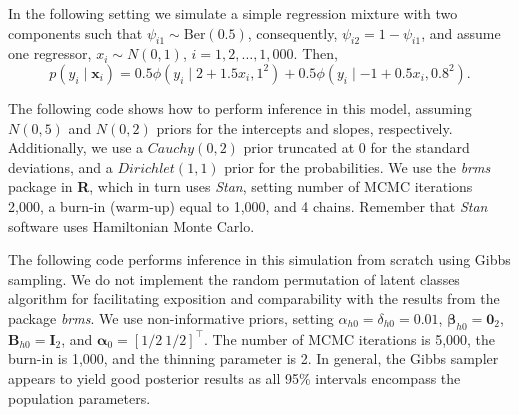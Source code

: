 In the following setting we simulate a simple regression mixture with two components such that $\psi_{i1}\sim \text{Ber}(0.5)$, consequently, $\psi_{i2}=1-\psi_{i1}$, and assume one regressor, $x_i\sim N(0,1)$, $i=1,2,\dots,1,000$. Then, 
$$p(y_i \mid \boldsymbol{x}_i) = 
0.5 \phi(y_i \mid 2+1.5x_i,1^2)+0.5 \phi(y_i \mid -1+0.5x_i,0.8^2).$$

The following code shows how to perform inference in this model, assuming $N(0,5)$ and $N(0,2)$ priors for the intercepts and slopes, respectively. Additionally, we use a $Cauchy(0,2)$ prior truncated at 0 for the standard deviations, and a $Dirichlet(1,1)$ prior for the probabilities. We use the \textit{brms} package in \textbf{R}, which in turn uses \textit{Stan}, setting number of MCMC iterations 2,000, a burn-in (warm-up) equal to 1,000, and 4 chains. Remember that \textit{Stan} software uses Hamiltonian Monte Carlo.

The following code performs inference in this simulation from scratch using Gibbs sampling. We do not implement the random permutation of latent classes algorithm for facilitating exposition and comparability with the results from the package \textit{brms}. We use non-informative priors, setting $\alpha_{h0}=\delta_{h0}=0.01$, $\boldsymbol{\beta}_{h0}=\boldsymbol{0}_2$, $\boldsymbol{B}_{h0}=\boldsymbol{I}_2$, and $\boldsymbol{\alpha}_0=[1/2 \ 1/2]^{\top}$. The number of MCMC iterations is 5,000, the burn-in is 1,000, and the thinning parameter is 2. In general, the Gibbs sampler appears to yield good posterior results as all 95\% intervals encompass the population parameters. 

